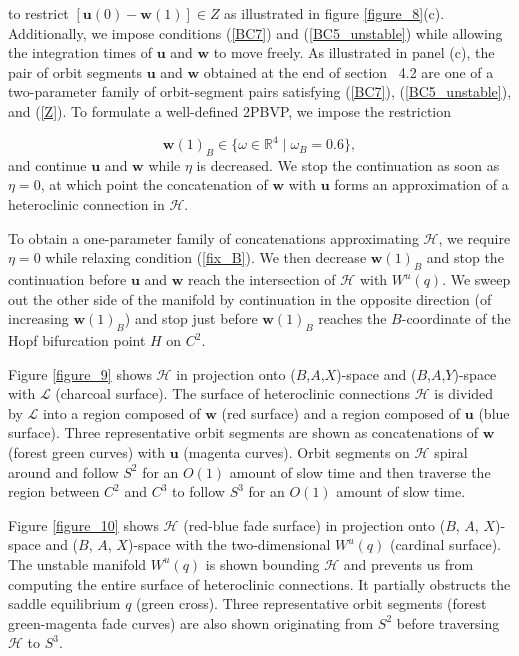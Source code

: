 \documentclass{ws-ijbc}
\begin{document}
\noindent
to restrict $[\mathbf{u}(0) -\mathbf{w}(1)] \in Z$ as illustrated in figure \ref{figure_8}(c).  Additionally, we impose conditions (\ref{BC7}) and (\ref{BC5_unstable}) while allowing the integration times of $\mathbf{u}$ and $\mathbf{w}$ to move freely.  As illustrated in panel (c), the pair of orbit segments $\mathbf{u}$ and $\mathbf{w}$ obtained at the end of section ~4.2 are one of a two-parameter family of orbit-segment pairs satisfying (\ref{BC7}), (\ref{BC5_unstable}), and (\ref{Z}).  To formulate a well-defined 2PBVP, we impose the restriction

\begin{equation}
\mathbf{w}(1)_B \in \{ \omega \in \mathbb{R}^4 \; | \; \omega_B = 0.6 \},
\label{fix_B}
\end{equation}  
\noindent
and continue $\mathbf{u}$ and $\mathbf{w}$ while $\eta$ is decreased.  We stop the continuation as soon as $\eta = 0$, at which point the concatenation of $\mathbf{w}$ with $\mathbf{u}$ forms an approximation of a heteroclinic connection in $\mathscr{H}$.

To obtain a one-parameter family of concatenations approximating $\mathscr{H}$, we require $\eta = 0$ while relaxing condition (\ref{fix_B}).  We then decrease $\mathbf{w}(1)_B$ and stop the continuation before $\mathbf{u}$ and $\mathbf{w}$ reach the intersection of $\mathscr{H}$ with $W^u(q)$.  We sweep out the other side of the manifold by continuation in the opposite direction (of increasing $\mathbf{w}(1)_B$) and stop just before $\mathbf{w}(1)_B$ reaches the $B$-coordinate of the Hopf bifurcation point $H$ on $C^2$.

Figure \ref{figure_9} shows $\mathscr{H}$ in projection onto ($B$,$A$,$X$)-space and ($B$,$A$,$Y$)-space with $\mathscr{L}$ (charcoal surface).  The surface of heteroclinic connections $\mathscr{H}$ is divided by $\mathscr{L}$ into a region composed of $\mathbf{w}$ (red surface) and a region composed of $\mathbf{u}$ (blue surface).  Three representative orbit segments are shown as concatenations of $\mathbf{w}$ (forest green curves) with $\mathbf{u}$ (magenta curves).  Orbit segments on $\mathscr{H}$ spiral around and follow $S^2$ for an $O(1)$ amount of slow time and then traverse the region between $C^2$ and $C^3$ to follow $S^3$ for an $O(1)$ amount of slow time.

Figure \ref{figure_10} shows $\mathscr{H}$ (red-blue fade surface) in projection onto ($B$, $A$, $X$)-space and ($B$, $A$, $X$)-space with the two-dimensional $W^u(q)$ (cardinal surface).  The unstable manifold $W^u(q)$ is shown bounding $\mathscr{H}$ and prevents us from computing the entire surface of heteroclinic connections.  It partially obstructs the saddle equilibrium $q$ (green cross).  Three representative orbit segments (forest green-magenta fade curves) are also shown originating from $S^2$ before traversing $\mathscr{H}$ to $S^3$.
\end{document}
